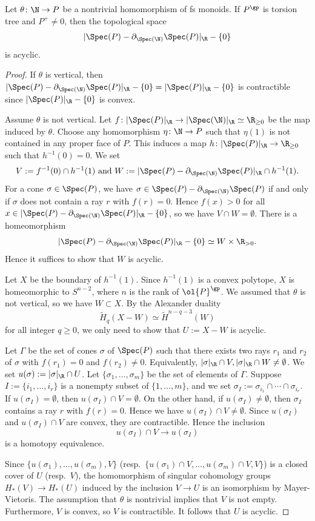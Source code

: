 \documentclass[10pt]{amsart}
\begin{document}
\begin{lem}
\label{lemma.16}
Let $\theta\colon \N\to P$ be a nontrivial homomorphism of fs monoids.
If $P^\gp$ is torsion tree and $P^+\neq 0$, then the topological space
\[
|\Spec(P)-\partial_{\Spec(\N)}\Spec(P)|_{\R}-\{0\}
\]
is acyclic.
\end{lem}
\begin{proof}
If $\theta$ is vertical, then
$|\Spec(P)-\partial_{\Spec(\N)}\Spec(P)|_{\R}-\{0\}=|\Spec(P)|_{\R}-\{0\}$ is contractible since $|\Spec(P)|_{\R}-\{0\}$ is convex.

Assume $\theta$ is not vertical.
Let $f\colon |\Spec(P)|_{\R}\to |\Spec(\N)|_{\R}\simeq \R_{\geq 0}$ be the map induced by $\theta$.
Choose any homomorphism $\eta\colon \N\to P$ such that $\eta(1)$ is not contained in any proper face of $P$.
This induces a map $h\colon |\Spec(P)|_{\R}\to \R_{\geq 0}$ such that $h^{-1}(0)=0$.
We set
\[
V:=f^{-1}(0)\cap h^{-1}(1)
\text{ and }
W:=|\Spec(P)-\partial_{\Spec(\N)}\Spec(P)|_{\R}\cap h^{-1}(1).
\]
For a cone $\sigma\in \Spec(P)$, we have $\sigma\in \Spec(P)-\partial_{\Spec(\N)}\Spec(P)$ if and only if $\sigma$ does not contain a ray $r$ with $f(r)=0$. 
Hence $f(x)>0$ for all $x\in |\Spec(P)-\partial_{\Spec(\N)}\Spec(P)|_{\R}-\{0\}$, so we have $V\cap W=\emptyset$.
There is a homeomorphism
\[
|\Spec(P)-\partial_{\Spec(\N)}\Spec(P)|_{\R}-\{0\}
\simeq
W\times \R_{>0}.
\]
Hence it suffices to show that $W$ is acyclic.

Let $X$ be the boundary of $h^{-1}(1)$.
Since $h^{-1}(1)$ is a convex polytope, $X$ is homeomorphic to $S^{n-2}$, where $n$ is the rank of $\ol{P}^\gp$.
We assumed that $\theta$ is not vertical, so we have $W\subset X$.
By the Alexander duality
\[
\tilde{H}_q(X-W)
\simeq
\tilde{H}^{n-q-3}(W)
\]
for all integer $q\geq 0$, we only need to show that $U:=X-W$ is acyclic.

Let $\Gamma$ be the set of cones $\sigma$ of $\Spec(P)$ such that there exists two rays $r_1$ and $r_2$ of $\sigma$ with $f(r_1)=0$ and $f(r_2)\neq 0$.
Equivalently, $|\sigma|_{\R}\cap V,|\sigma|_{\R}\cap W\neq \emptyset$.
We set $u(\sigma):=|\sigma|_{\R}\cap U$.
Let $\{\sigma_1,\ldots,\sigma_m\}$ be the set of elements of $\Gamma$.
Suppose $I:=\{i_1,\ldots,i_r\}$ is a nonempty subset of $\{1,\ldots,m\}$, and we set $\sigma_I:=\sigma_{i_1}\cap \cdots \cap \sigma_{i_r}$.
If $u(\sigma_I)=\emptyset$, then $u(\sigma_I)\cap V=\emptyset$.
On the other hand, if $u(\sigma_I)\neq \emptyset$, then $\sigma_I$ contains a ray $r$ with $f(r)=0$.
Hence we have $u(\sigma_I)\cap V\neq \emptyset$.
Since $u(\sigma_I)$ and $u(\sigma_I)\cap V$ are convex, they are contractible.
Hence the inclusion
\[
u(\sigma_I)\cap V
\to
u(\sigma_I)
\]
is a homotopy equivalence.

Since 
$\{u(\sigma_1),\ldots,u(\sigma_m),V\}$ (resp.\ $\{u(\sigma_1)\cap V,\ldots,u(\sigma_m)\cap V,V\}$) is a closed cover of $U$ (resp.\ $V$), the homomorphism of singular cohomology groups $H_*(V)\to H_*(U)$ induced by the inclusion $V\to U$ is an isomorphism by 
Mayer-Vietoris.
The assumption that $\theta$ is nontrivial implies that $V$ is not empty.
Furthermore, $V$ is convex, so $V$ is contractible.
It follows that $U$ is acyclic.
\end{proof}
\end{document}
